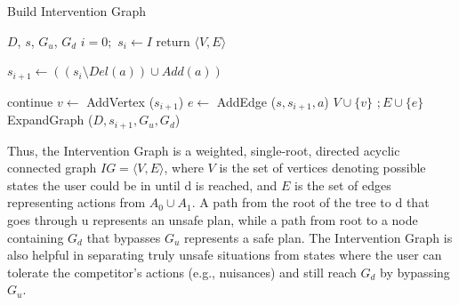 \documentclass[letterpaper]{article}
\theoremstyle{plain}
\begin{document}
\begin{algorithm}[tb]
        \caption{Build Intervention Graph}
        \label{bsg}
        \begin{algorithmic}[1]
                \Require $D$, $s$, $G_u$, $G_d$
                \State $i=0;$ $ s_{i} \gets I $
                 return $\langle V,E\rangle$
                \Else
                                \State \parbox[t]{0.95\linewidth} 
                                {$s_{i+1} \gets ((s_{i} \setminus Del(a))\cup Add(a))$}
                                 continue \EndIf
                                \State $v \gets$ AddVertex ($s_{i+1}$)
                                \State $e \gets$ AddEdge ($s, s_{i+1}, a$)
                                \State $V \cup \{v\}$ $; E \cup \{e\}$
                                \State ExpandGraph ($D, s_{i+1}, G_u, G_d$)
                        \EndFor
                \EndIf  
                \EndProcedure
        \end{algorithmic}
\end{algorithm}

Thus, the Intervention Graph is a weighted, single-root, directed acyclic connected graph $IG= \langle V,E \rangle$, where $V$ is the set of vertices denoting possible states the user could be in until $\mathrm{d}$ is reached, and $E$ is the set of edges representing actions from $A_0 \cup A_{1}$. A path from the root of the tree to $\mathrm{d}$ that goes through $\mathrm{u}$ represents an unsafe plan, while a path from root to a node containing $G_d$ that bypasses $G_u$ represents a safe plan. The Intervention Graph is also helpful in separating truly unsafe situations from states where the user can tolerate the competitor's actions (e.g., nuisances) and still reach $G_d$ by bypassing $G_u$. 
\end{document}
